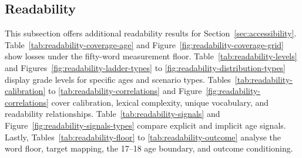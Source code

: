 \providecommand{\blocktag}[1]{%
    \begingroup
    \setlength{\fboxsep}{3.2pt}%
    \colorbox{blockTint}{%
        \strut
        \textit{#1}%
    }%
    \endgroup
}

\subsection{Readability}
\label{app:readability}

This subsection offers additional readability results for Section~\ref{sec:accessibility}. Table~\ref{tab:readability-coverage-age} and Figure~\ref{fig:readability-coverage-grid} show losses under the fifty-word measurement floor. Table~\ref{tab:readability-levels} and Figures~\ref{fig:readability-ladder-types} to \ref{fig:readability-distribution-types} display grade levels for specific ages and scenario types. Tables~\ref{tab:readability-calibration} to \ref{tab:readability-correlations} and Figure~\ref{fig:readability-correlations} cover calibration, lexical complexity, unique vocabulary, and readability relationships. Table~\ref{tab:readability-signals} and Figure~\ref{fig:readability-signals-types} compare explicit and implicit age signals. Lastly, Tables~\ref{tab:readability-floor} to \ref{tab:readability-outcome} analyse the word floor, target mapping, the 17–18 age boundary, and outcome conditioning.

